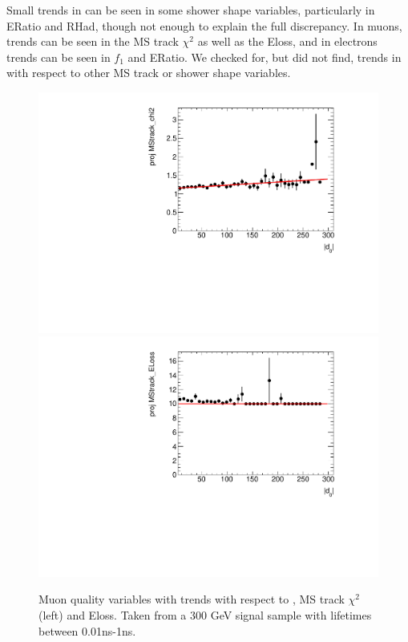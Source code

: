 


Small trends in \dz can be seen in some shower shape variables, particularly in ERatio and RHad, though not enough to explain the full discrepancy. In muons, trends can be seen in the MS track $\chi^{2}$ as well as the Eloss, and in electrons trends can be seen in $f_{1}$ and ERatio. We checked for, but did not find, trends in \dz with respect to other MS track or shower shape variables. 


\begin{figure}[htbp]
\centering
\includegraphics[width=.48\textwidth]{figures/disp_systs/m_signal_MStrack_chi2_profile.pdf}
\includegraphics[width=.48\textwidth]{figures/disp_systs/m_signal_MStrack_ELoss_profile.pdf}
\caption{Muon quality variables with trends with respect to \absdz, MS track $\chi^{2}$ (left) and Eloss. Taken from a 300 GeV signal sample with lifetimes between 0.01ns-1ns.}
\label{fig:profs_mu}
\end{figure}

